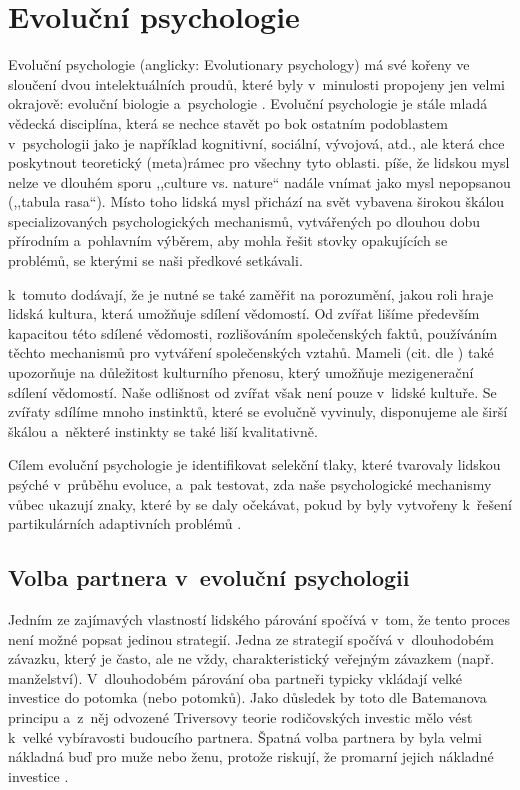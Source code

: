 \documentclass[a4paper, 12pt, notitlepage, oneside, numbers=noenddot]{report}
\begin{document}
\section{Evoluční psychologie}
Evoluční psychologie (anglicky: Evolutionary psychology) má své kořeny
ve sloučení dvou intelektuálních proudů, které byly v~minulosti
propojeny jen velmi okrajově: evoluční biologie a~psychologie
\citep{DunbarBarrett2009}.  Evoluční psychologie je stále mladá
vědecká disciplína, která se nechce stavět po bok ostatním podoblastem
v~psychologii jako je například kognitivní, sociální, vývojová, atd.,
ale která chce poskytnout teoretický (meta)rámec pro všechny tyto
oblasti.  \citet{Handbook2005} píše, že lidskou mysl nelze
ve dlouhém sporu ,,culture vs. nature`` nadále vnímat jako mysl
nepopsanou (,,tabula rasa``).  Místo toho lidská mysl přichází na svět
vybavena širokou škálou specializovaných psychologických mechanismů,
vytvářených po dlouhou dobu přírodním a~pohlavním vý\-běr\-em, aby mohla
řešit stovky opakujících se problémů, se kterými se naši předkové
setkávali.

\citet{DunbarBarrett2009} k~tomuto dodávají, že je nutné se také
zaměřit na porozumění, jakou roli hraje lidská kultura, která umožňuje
sdílení vědomostí.  Od zvířat lišíme především kapacitou této sdílené
vědomosti, rozlišováním společenských faktů, používáním těchto
mechanismů pro vytváření společenských vztahů.  Mameli (cit. dle
\citealp{DunbarBarrett2009}) také upozorňuje na důležitost kulturního
přenosu, který u\-mo\-žňu\-je mezigenerační sdílení vědomostí.  Naše
odlišnost od zvířat však není pouze v~lidské kultuře.  Se zvířaty
sdílíme mnoho instinktů, které se evolučně vyvinuly, disponujeme ale
širší škálou a~některé instinkty se také liší kvalitativně.

Cílem evoluční psychologie je identifikovat selekční tlaky, které
tvarovaly lidskou psýché v~průběhu evoluce, a~pak testovat, zda naše
psychologické mechanismy vůbec ukazují znaky, které by se daly
očekávat, pokud by byly vytvořeny k~řešení partikulárních adaptivních
problémů \citep{BarrettDunbarLycett2007}.

\subsection{Volba partnera v~evoluční psychologii}

Jedním ze zajímavých vlastností lidského párování spočívá v~tom, že
tento proces není možné popsat jedinou strategií.  Jedna ze strategií
spočívá v~dlouhodobém závazku, který je často, ale ne vždy,
charakteristický veřejným závazkem (např. manželství).  V~dlou\-ho\-do\-bém
párování oba partneři typicky vkládají velké investice do potomka
(nebo potomků).  Jako důsledek by toto dle Batemanova principu a~z~něj
odvozené Triversovy teorie rodičovských investic mělo vést k~velké
vybíravosti budoucího partnera.  Špatná volba partnera by byla velmi
nákladná buď pro muže nebo ženu, protože riskují, že promarní jejich
nákladné investice \citep{Buss2007}.
\end{document}
